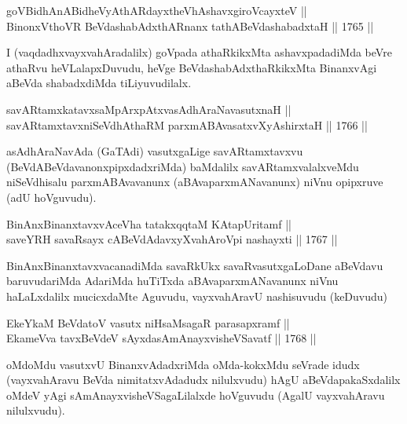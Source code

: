 \begin{shl}
goVBidhAnABidheVyAthARdayxtheVhAshavxgiroVcayxteV || \\
BinonxV\s thoVR BeVdashabAdxthARnanx tathA\s BeVdashabadxtaH \hfill || 1765 ||  
\end{shl}

\begin{artha}
I (vaqdadhxvayxvahAradalilx) goVpada athaRkikxMta ashavxpadadiMda
beVre athaRvu heVLalapxDuvudu, heVge BeVdashabAdxthaRkikxMta
BinanxvAgi aBeVda shabadxdiMda tiLiyuvudilalx.
\end{artha}


\begin{shl}
savARtamxkatavxsaMpArxpAtxvasAdhAraNavasutxnaH || \\
savARtamxtavxniSeVdhAthaRM parxmABAvasatxvXyA\s \s shirxtaH \hfill || 1766 ||  
\end{shl}

\begin{artha}
asAdhAraNavAda (GaTAdi) vasutxgaLige savARtamxtavxvu
(BeVdABeVdavanonxpipxdadxriMda) baMdalilx savARtamxvalalxveMdu
niSeVdhisalu parxmABAvavanunx (aBAvaparxmANavanunx) niVnu opipxruve
(adU hoVguvudu). 
\end{artha}

\begin{shl}
BinAnxBinanxtavxvAceVha tatakxqqtaM KAtapUritamf || \\
saveYRH savaRsayx cABeVdAdavxyXvahAroV\s pi nashayxti \hfill || 1767 || 
\end{shl}

\begin{artha}
BinAnxBinanxtavxvacanadiMda savaRkUkx savaRvasutxgaLoDane aBeVdavu
baruvudariMda AdariMda huTiTxda aBAvaparxmANavanunx niVnu haLaLxdalilx
mucicxdaMte Aguvudu, vayxvahAravU nashisuvudu (keDuvudu)
\end{artha}


\begin{shl}
EkeYkaM BeVdatoV vasutx niHsaMsagaR parasapxramf || \\
EkameVva tavxBeVdeV sAyxdasAmAnayxvisheVSavatf \hfill || 1768 ||  
\end{shl}

\begin{artha}
oMdoMdu vasutxvU BinanxvAdadxriMda oMda-kokxMdu seVrade idudx
(vayxvahAravu BeVda nimitatxvAdadudx nilulxvudu) hAgU aBeVdapakaSxdalilx oMdeV yAgi sAmAnayxvisheVSagaLilalxde hoVguvudu (AgalU
vayxvahAravu nilulxvudu).
\end{artha}

